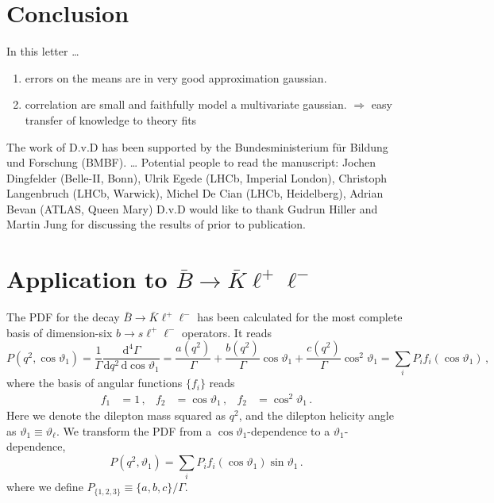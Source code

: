 \documentclass[aps,prd,reprint,nofootinbib,preprintnumbers]{revtex4}
\newcommand{\dd}{\text{d}}
\renewcommand{\theta}{\vartheta}
\newcommand{\danny}[1]{{\color{purple}#1}}
\newcommand{\fred}[1]{{\color{brown!85!black}#1}}
\begin{document}
\section{Conclusion}

In this letter \dots
\begin{enumerate}
    \item errors on the means are in very good approximation gaussian.
    \item correlation are small and faithfully model a multivariate gaussian. \fred{$\Rightarrow$ easy transfer of knowledge to theory fits}
\end{enumerate}


\acknowledgments

The work of D.v.D has been supported by the Bundesministerium f\"ur Bildung und Forschung (BMBF).
\dots
\danny{Potential people to read the manuscript: Jochen Dingfelder (Belle-II, Bonn), Ulrik Egede (LHCb, Imperial London), Christoph Langenbruch (LHCb, Warwick), Michel De Cian (LHCb, Heidelberg), Adrian Bevan (ATLAS, Queen Mary)  }
D.v.D would like to thank Gudrun Hiller and Martin Jung for discussing the results of \cite{Das:2014sra} prior to publication.

\appendix

\section{Application to $\bar{B}\to\bar{K}\ell^+\ell^-$}
\label{app:btokll}

The PDF for the decay $\bar{B}\to\bar{K}\ell^+\ell^-$ has been calculated for the most
complete basis of dimension-six $b\to s \ell^+\ell^-$ operators. It reads \cite{Bobeth:2007dw,Bobeth:2012vn}
\begin{equation}
    P(q^2, \cos\theta_1) = \frac{1}{\Gamma} \frac{\dd^4\Gamma}{\dd q^2\,\dd \cos\theta_1} = \frac{a(q^2)}{\Gamma} + \frac{b(q^2)}{\Gamma} \cos\theta_1 + \frac{c(q^2)}{\Gamma} \cos^2\theta_1 = \sum_i P_i f_i(\cos\theta_1)\,,
\end{equation}
where the basis of angular functions $\lbrace f_i\rbrace$ reads
\begin{equation}
\begin{aligned}
    f_1 & = 1\,, &
    f_2 & = \cos\theta_1\,, &
    f_2 & = \cos^2\theta_1\,.
\end{aligned}
\end{equation}
Here we denote the dilepton mass squared as $q^2$, and the dilepton helicity angle as $\theta_1 \equiv \theta_{\ell}$. We transform the PDF from a $\cos\theta_1$-dependence
to a $\theta_1$-dependence,
\begin{equation}
    P(q^2, \theta_1) = \sum_i P_i f_i(\cos\theta_1) \sin \theta_1\,.
\end{equation}
where we define $P_{\lbrace 1,2,3\rbrace} \equiv \lbrace a, b, c\rbrace / \Gamma$.\\
\end{document}
